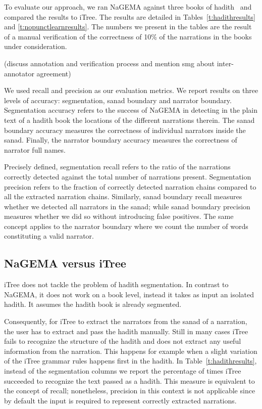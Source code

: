 \documentclass{llncs}
\begin{document}
To evaluate our approach, we ran NaGEMA against three books of 
hadith~\cite{IbnHanbal,AlTousi,AlKulayni} and compared the
results to iTree. 
The results are detailed in 
Tables~\ref{t:hadithresults} and \ref{t:nopunctlearnresults}. 
The numbers we present in the tables are the result of a 
manual verification of the correctness of %
10\% of the narrations in the books under consideration.

(discuss annotation and verification process and mention smg about inter-annotator agreement)

We used recall and precision as our evaluation metrics.
We report results on three levels of accuracy: segmentation, sanad boundary and
narrator boundary. 
Segmentation accuracy refers to the success of NaGEMA in
detecting in the plain text of a hadith book the locations of the different
narrations therein.
The sanad boundary accuracy measures the
correctness of individual narrators inside the sanad. 
Finally, the narrator boundary accuracy measures
the correctness of narrator full names. 

Precisely defined, segmentation recall refers to the ratio of the narrations correctly detected against the
total number of narrations present. 
Segmentation precision refers to the fraction of correctly detected narration chains compared to all the extracted
narration chains. 
Similarly, sanad boundary recall measures whether we detected all narrators
in the sanad; while sanad boundary precision measures whether we did so without introducing false positives. 
The same concept applies to the narrator boundary where we count the number of words constituting 
a valid narrator.

\subsection{NaGEMA versus iTree}

iTree does not tackle the problem of hadith segmentation. 
In contrast to NaGEMA, it does not work on a book level, 
instead it takes as input an isolated hadith. 
It assumes the hadith book is already segmented. 

Consequently, for iTree to extract the narrators from the sanad of a narration, 
the user has to extract and pass the hadith manually.
Still in many cases iTree fails to recognize the structure of
the hadith and does not extract any useful information from the narration. 
This happens for example when a slight variation of the iTree grammar rules 
happens first in the hadith.
In Table~\ref{t:hadithresults}, instead of the segmentation columns 
we report the percentage of times iTree succeeded to recognize the text passed
as a hadith.
This measure is equivalent to the concept of recall; nonetheless, precision
in this context is not applicable since by default the input is required 
to represent correctly extracted narrations.
\end{document}
